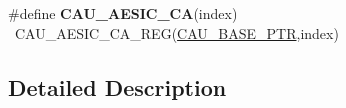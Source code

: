 \begin{DoxyCompactItemize}
\item 
\hypertarget{group___c_a_u___register___accessor___macros_ga2c0b3c33db6e292d511f5f228fdc0719}{}\#define {\bfseries C\+A\+U\+\_\+\+A\+E\+S\+I\+C\+\_\+\+C\+A}(index)                                        ~C\+A\+U\+\_\+\+A\+E\+S\+I\+C\+\_\+\+C\+A\+\_\+\+R\+E\+G(\hyperlink{group___c_a_u___peripheral_gaf2a80b84a866e513ee484bbb861fa36d}{C\+A\+U\+\_\+\+B\+A\+S\+E\+\_\+\+P\+T\+R},index)\label{group___c_a_u___register___accessor___macros_ga2c0b3c33db6e292d511f5f228fdc0719}

\end{DoxyCompactItemize}


\subsection{Detailed Description}
